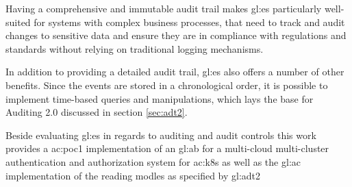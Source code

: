 Having a comprehensive and immutable audit trail makes \gls{gl:es} particularly well-suited for systems with complex business processes, that need to track and audit changes to sensitive data and ensure they are in compliance with regulations and standards without relying on traditional logging mechanisms.

In addition to providing a detailed audit trail, \gls{gl:es} also offers a number of other benefits. Since the events are stored in a chronological order, it is possible to implement time-based queries and manipulations, which lays the base for Auditing 2.0 discussed in section \ref{sec:adt2}.

Beside evaluating \gls{gl:es} in regards to auditing and audit controls this work provides a \gls{ac:poc1} implementation of an \gls{gl:ab} for a multi-cloud multi-cluster authentication and authorization system for \gls{ac:k8s} as well as the \gls{gl:ac} implementation of the reading modles as specified by \gls{gl:adt2}